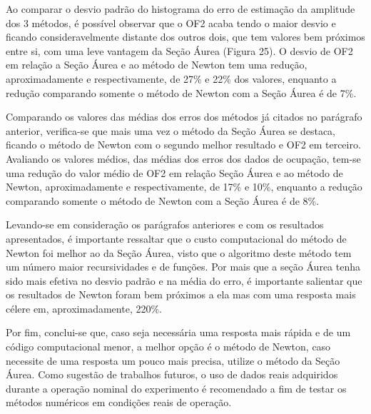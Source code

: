 Ao comparar o desvio padrão do histograma do erro de estimação da amplitude dos 3 métodos, é possível observar que o OF2 acaba tendo o maior desvio e ficando consideravelmente distante dos outros dois, que tem valores bem próximos entre si, com uma leve vantagem da Seção Áurea (Figura 25). O desvio de OF2 em relação a Seção Áurea e ao método de Newton tem uma redução, aproximadamente e respectivamente, de 27\% e 22\% dos valores, enquanto a redução comparando somente o método de Newton com a Seção Áurea é de 7\%.

Comparando os valores das médias dos erros dos métodos já citados no parágrafo anterior, verifica-se que mais uma vez o método da Seção Áurea se destaca, ficando o método de Newton com o segundo melhor resultado e OF2 em terceiro. Avaliando os valores médios, das médias dos erros dos dados de ocupação, tem-se uma redução do valor médio de OF2 em relação Seção Áurea e ao método de Newton, aproximadamente e respectivamente, de 17\% e 10\%, enquanto a redução comparando somente o método de Newton com a Seção Áurea é de 8\%.

Levando-se em consideração os parágrafos anteriores e com os resultados apresentados, é importante ressaltar que o custo computacional do método de Newton foi melhor ao da Seção Áurea, visto que o algoritmo deste método tem um número maior recursividades e de funções. Por mais que a seção Áurea tenha sido mais efetiva no desvio padrão e na média do erro, é importante salientar que os resultados de Newton foram bem próximos a ela mas com uma resposta mais célere em, aproximadamente, 220\%.

Por fim, conclui-se que, caso seja necessária uma resposta mais rápida e de um código computacional menor, a melhor opção é o método de Newton, caso necessite de uma resposta um pouco mais precisa, utilize o método da Seção Áurea. Como sugestão de trabalhos futuros, o uso de dados reais adquiridos durante a operação nominal do experimento é recomendado a fim de testar os métodos numéricos em condições reais de operação.